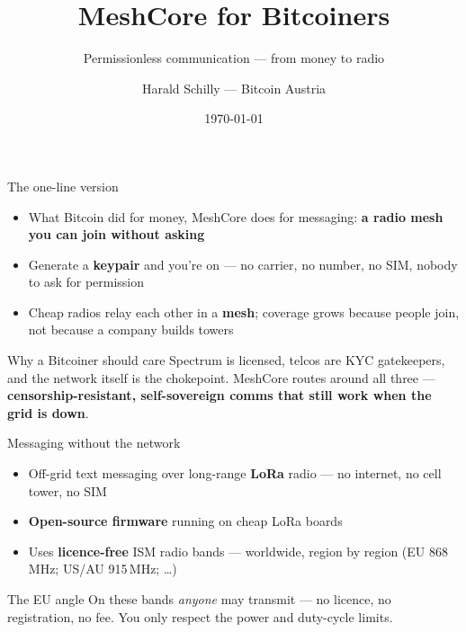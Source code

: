 \documentclass[aspectratio=\baAspect,t,9pt]{beamer}
\title{MeshCore for Bitcoiners}
\subtitle{Permissionless communication --- from money to radio}
\author{Harald Schilly --- Bitcoin Austria}
\date{\today}
\begin{document}
\begin{frame}
  \titlepage
\end{frame}


\begin{frame}{The one-line version}
  \begin{itemize}
    \item What Bitcoin did for money, MeshCore does for messaging:
      \textbf{a radio mesh you can join without asking}
    \item Generate a \textbf{keypair} and you're on --- no carrier, no number,
      no SIM, nobody to ask for permission
    \item Cheap radios relay each other in a \textbf{mesh}; coverage grows because
      people join, not because a company builds towers
  \end{itemize}
  \vfill
  \begin{alertblock}{Why a Bitcoiner should care}
    Spectrum is licensed, telcos are KYC gatekeepers, and the network itself is
    the chokepoint. MeshCore routes around all three ---
    \textbf{censorship-resistant, self-sovereign comms that still work when the
    grid is down}.
  \end{alertblock}
\end{frame}

\begin{frame}{Messaging without the network}
  \begin{itemize}
    \item Off-grid text messaging over long-range \textbf{LoRa} radio ---
      no internet, no cell tower, no SIM
    \item \textbf{Open-source firmware} running on cheap LoRa boards
    \item Uses \textbf{licence-free} ISM radio bands --- worldwide, region by
      region (EU 868\,MHz; US/AU 915\,MHz; \dots)
  \end{itemize}
  \vfill
  \begin{alertblock}{The EU angle}
    On these bands \emph{anyone} may transmit --- no licence, no registration, no
    fee. You only respect the power and duty-cycle limits.
  \end{alertblock}
\end{frame}
\end{document}
